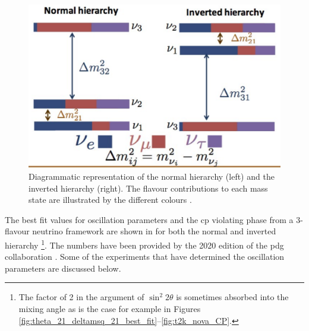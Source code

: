 \begin{figure}[h!]
    \centering
    \includegraphics[width = \largefigwidth]{figures-chap2/mass_hierarchy-crop.pdf}
    \caption[Neutrino hierarchy.]{Diagrammatic representation of the normal hierarchy (left) and the inverted hierarchy (right). The flavour contributions to each mass state are illustrated by the different colours \cite{mass_hierarchy_image_2}.}
    \label{fig:mass_hierarchy}
\end{figure}



\newpage
The best fit values for oscillation parameters and the \gls{cp} violating phase from a 3-flavour neutrino framework are shown in  for both the normal and inverted hierarchy \footnote{The factor of 2 in the argument of $\sin^2{2\theta}$ is sometimes absorbed into the mixing angle as is the case for example in Figures \ref{fig:theta_21_deltamsq_21_best_fit}--\ref{fig:t2k_nova_CP}.}. The numbers have been provided by the 2020 edition of the \gls{pdg} collaboration \cite{PDG_2020}. Some of the experiments that have determined the oscillation parameters are discussed below. 

